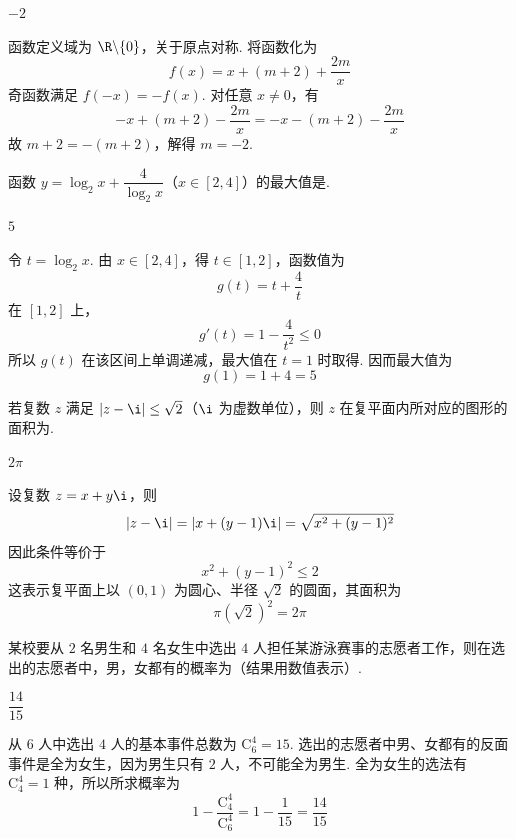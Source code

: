 \begin{answer}
\(-2\)
\end{answer}

\begin{solution}
函数定义域为 \(\R\backslash\{0\}\)，关于原点对称. 将函数化为
\[
f(x)=x+(m+2)+\frac{2m}{x}
\]
奇函数满足 \(f(-x)=-f(x)\). 对任意 \(x\ne0\)，有
\[
-x+(m+2)-\frac{2m}{x}=-x-(m+2)-\frac{2m}{x}
\]
故 \(m+2=-(m+2)\)，解得 \(m=-2\).
\end{solution}

\begin{problem}
函数 \(y=\log_2 x+\dfrac{4}{\log_2 x}\)（\(x\in[2,4]\)）的最大值是\fillinblank{}.
\end{problem}

\begin{answer}
\(5\)
\end{answer}

\begin{solution}
令 \(t=\log_2x\). 由 \(x\in[2,4]\)，得 \(t\in[1,2]\)，函数值为
\[
g(t)=t+\frac{4}{t}
\]
在 \([1,2]\) 上，
\[
g'(t)=1-\frac{4}{t^2}\le0
\]
所以 \(g(t)\) 在该区间上单调递减，最大值在 \(t=1\) 时取得. 因而最大值为
\[
g(1)=1+4=5
\]
\end{solution}

\begin{problem}
若复数 \(z\) 满足 \(|z-\i|\le\sqrt2\)（\(\i\) 为虚数单位），则 \(z\) 在复平面内所对应的图形的面积为\fillinblank{}.
\end{problem}

\begin{answer}
\(2\pi\)
\end{answer}

\begin{solution}
设复数 \(z=x+y\i\)，则
\[
|z-\i|=|x+(y-1)\i|=\sqrt{x^2+(y-1)^2}
\]
因此条件等价于
\[
x^2+(y-1)^2\le2
\]
这表示复平面上以 \((0,1)\) 为圆心、半径 \(\sqrt2\) 的圆面，其面积为
\[
\pi(\sqrt2)^2=2\pi
\]
\end{solution}

\begin{problem}
某校要从 \(2\) 名男生和 \(4\) 名女生中选出 \(4\) 人担任某游泳赛事的志愿者工作，则在选出的志愿者中，男，女都有的概率为\fillinblank{}（结果用数值表示）.
\end{problem}

\begin{answer}
\(\dfrac{14}{15}\)
\end{answer}

\begin{solution}
从 \(6\) 人中选出 \(4\) 人的基本事件总数为 \(\mathrm C_6^4=15\). 选出的志愿者中男、女都有的反面事件是全为女生，因为男生只有 \(2\) 人，不可能全为男生. 全为女生的选法有 \(\mathrm C_4^4=1\) 种，所以所求概率为
\[
1-\frac{\mathrm C_4^4}{\mathrm C_6^4}=1-\frac{1}{15}=\frac{14}{15}
\]
\end{solution}

